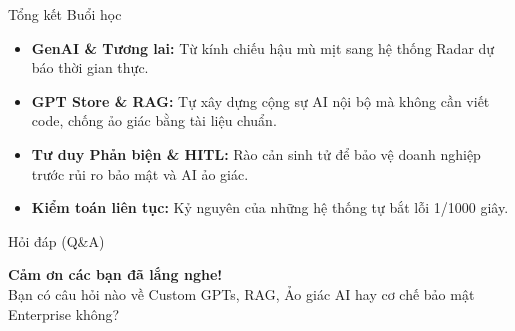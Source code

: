 \documentclass[aspectratio=169,12pt]{beamer}
\begin{document}
\begin{frame}{Tổng kết Buổi học}
    \begin{itemize}
        \item \textbf{GenAI \& Tương lai:} Từ kính chiếu hậu mù mịt sang hệ thống Radar dự báo thời gian thực.
        \item \textbf{GPT Store \& RAG:} Tự xây dựng cộng sự AI nội bộ mà không cần viết code, chống ảo giác bằng tài liệu chuẩn.
        \item \textbf{Tư duy Phản biện \& HITL:} Rào cản sinh tử để bảo vệ doanh nghiệp trước rủi ro bảo mật và AI ảo giác.
        \item \textbf{Kiểm toán liên tục:} Kỷ nguyên của những hệ thống tự bắt lỗi 1/1000 giây.
    \end{itemize}
\end{frame}

\begin{frame}{Hỏi đáp (Q\&A)}
    \begin{center}
        \Large \textbf{Cảm ơn các bạn đã lắng nghe!}\\
        \vspace{1cm}
        Bạn có câu hỏi nào về Custom GPTs, RAG, Ảo giác AI hay cơ chế bảo mật Enterprise không?
    \end{center}
\end{frame}
\end{document}
